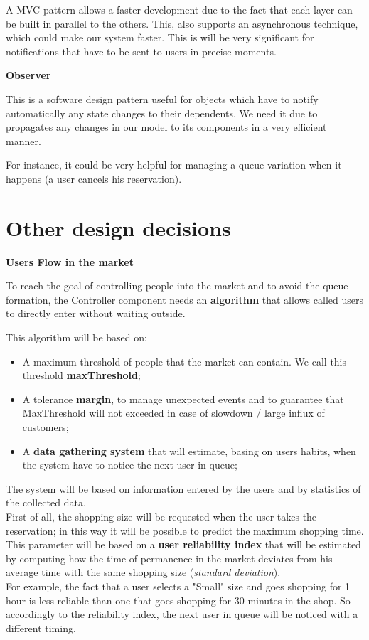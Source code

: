 A MVC pattern allows a faster development due to the fact that each layer can be built in parallel to the others. This, also supports an asynchronous technique, which could make our system faster. This is will be very significant for notifications that have to be sent to users in precise moments.\\
\par
\textbf{Observer} \par
This is a software design pattern useful for objects which have to notify automatically any state changes to their dependents. We need it due to propagates any changes in our model to its components in a very efficient manner.

For instance, it could be very helpful for managing a queue variation when it happens (a user cancels his reservation).


\section{Other design decisions}
\textbf{Users Flow in the market} \par
To reach the goal of controlling people into the market and to avoid the queue formation, the Controller component needs an \textbf{algorithm} that allows called users to directly enter without waiting outside. 

This algorithm will be based on:
\begin{itemize}
\item A maximum threshold of people that the market can contain. We call this threshold \textbf{maxThreshold};
\item A tolerance \textbf{margin}, to manage unexpected events and to guarantee that MaxThreshold will not exceeded in case of slowdown / large influx of customers;
\item A \textbf{data gathering system} that will estimate, basing on users habits, when the system have to notice the next user in queue;
\end{itemize}


The system will be based on information entered by the users and by statistics of the collected data.\\
First of all, the shopping size will be requested when the user takes the reservation; in this way it will be possible to predict the maximum shopping time. 
This parameter will be based on a \textbf{user reliability index} that will be estimated by computing how the time of permanence in the market deviates from his average time with the same shopping size (\textit{standard deviation}).  \\
For example, the fact that a user selects a "Small" size and goes shopping for 1 hour is less reliable than one that goes shopping for 30 minutes in the shop.
So accordingly to the reliability index, the next user in queue will be noticed with a different timing.

